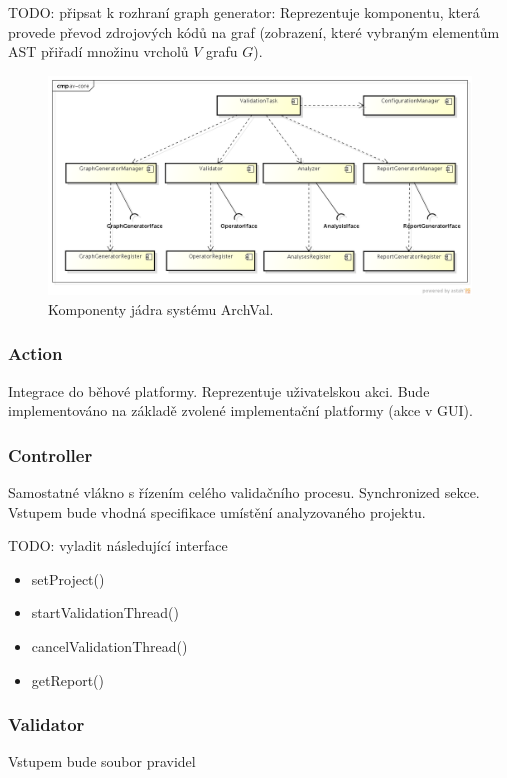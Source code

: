 TODO: připsat k rozhraní graph generator: Reprezentuje komponentu, která provede převod zdrojových kódů na graf (zobrazení, které vybraným elementům AST přiřadí množinu vrcholů $V$ grafu $G$).

\begin{figure}[h!]
  \centering
  \includegraphics[width=1.0\textwidth]{./uml/archval_core_cmp.png}
  \caption{Komponenty jádra systému ArchVal.\label{design-archval_core}}
\end{figure}

\subsubsection{Action}
Integrace do běhové platformy. Reprezentuje uživatelskou akci. Bude implementováno na základě zvolené implementační platformy (akce v GUI).

\subsubsection{Controller}
Samostatné vlákno s řízením celého validačního procesu. Synchronized sekce. Vstupem bude vhodná specifikace umístění analyzovaného projektu.

TODO: vyladit následující interface
\begin{itemize}
\item setProject()
\item startValidationThread()
\item cancelValidationThread()
\item getReport()
\end{itemize}

\subsubsection{Validator}
Vstupem bude soubor pravidel

